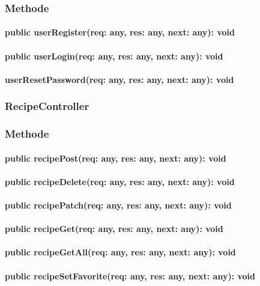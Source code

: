 \documentclass[parskip=full]{scrartcl}
\begin{document}
\subsubsection*{Methode}
\paragraph{public userRegister(req: any, res: any, next: any): void}
\paragraph{public userLogin(req: any, res: any, next: any): void}
\paragraph{userResetPassword(req: any, res: any, next: any): void}
\paragraph{}

\subsubsection{RecipeController}
\subsubsection*{Methode}
\paragraph{public recipePost(req: any, res: any, next: any): void}
\paragraph{public recipeDelete(req: any, res: any, next: any): void}
\paragraph{public recipePatch(req: any, res: any, next: any): void}
\paragraph{public recipeGet(req: any, res: any, next: any): void}
\paragraph{public recipeGetAll(req: any, res: any, next: any): void}
\paragraph{public recipeSetFavorite(req: any, res: any, next: any): void}
\end{document}
